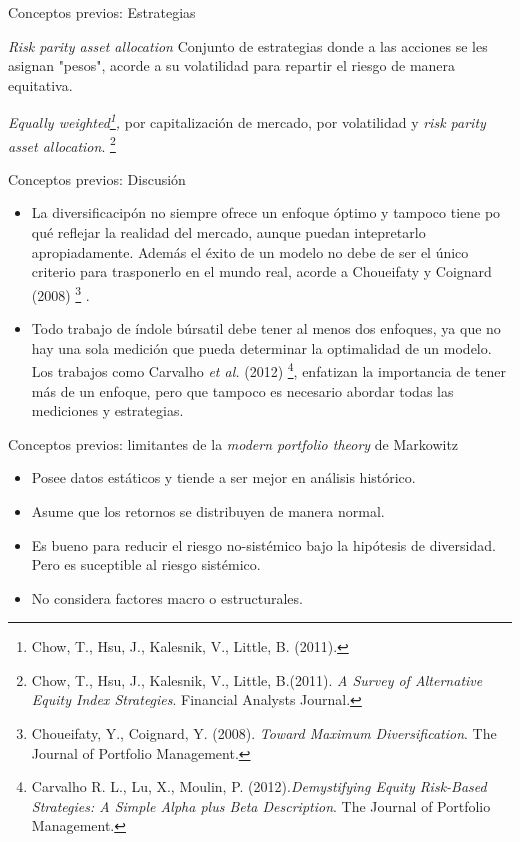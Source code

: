 \documentclass[aspectratio=169,xcolor=dvipsnames]{beamer}
\begin{document}
\begin{frame}{Conceptos previos: Estrategias}
        \begin{block}{\textit{Risk parity asset allocation}}
        Conjunto de estrategias donde a las acciones se les asignan "pesos", acorde a su volatilidad para repartir el riesgo de manera equitativa.
        \end{block}
         \begin{examples}
        \textit{Equally weighted\footnote{ Chow, T., Hsu, J., Kalesnik, V., Little, B. (2011).},} por capitalización de mercado,
         por volatilidad y \textit{risk parity asset allocation}.
        \footnote{ Chow, T., Hsu, J., Kalesnik, V., Little, B.(2011). \emph{A Survey of Alternative Equity Index Strategies}. Financial Analysts Journal.}
    \end{examples}
\end{frame}

\begin{frame}{Conceptos previos: Discusión}
\begin{itemize}
    \item La diversificacipón no siempre ofrece un enfoque óptimo y tampoco tiene po qué reflejar la realidad del mercado,
     aunque puedan intepretarlo apropiadamente. Además el éxito de un modelo no debe de ser el único criterio para trasponerlo
      en el mundo real, acorde a Choueifaty y Coignard (2008) \footnote{Choueifaty, Y., Coignard, Y. (2008). 
      \emph{Toward Maximum Diversification}. The Journal of Portfolio Management.} .
    \item Todo trabajo de índole búrsatil debe tener al menos dos enfoques, ya que no hay una sola medición que pueda determinar
     la optimalidad de un modelo. Los trabajos como Carvalho \emph{et al.} (2012) \footnote{  Carvalho R. L., Lu, X., Moulin, P.
      (2012).\emph{Demystifying Equity Risk-Based Strategies: A Simple Alpha plus Beta Description}. The Journal of Portfolio Management.},
       enfatizan la importancia de tener más de un enfoque, pero que tampoco es necesario abordar todas las mediciones y estrategias.
    \end{itemize}
\end{frame}

\begin{frame}{Conceptos previos: limitantes de la \textit{modern portfolio theory} de Markowitz}
    \begin{itemize}
        \item Posee datos estáticos y tiende a ser mejor en análisis histórico.
        \item Asume que los retornos se distribuyen de manera normal.
        \item Es bueno para reducir el riesgo no-sistémico bajo la hipótesis de diversidad. Pero es suceptible al riesgo sistémico.
        \item No considera factores macro o estructurales.
    \end{itemize}
\end{frame}
\end{document}
